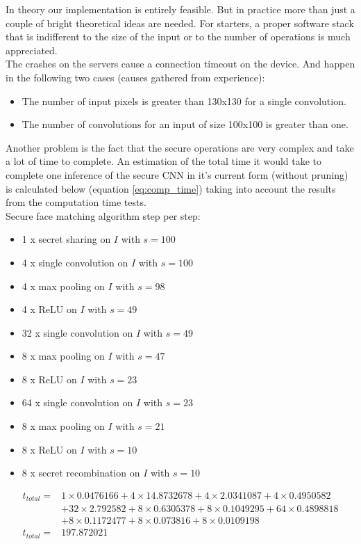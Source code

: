 In theory our implementation is entirely feasible. But in practice more than just a couple of bright theoretical ideas are needed. For starters, a proper software stack that is indifferent to the size of the input or to the number of operations is much appreciated.\\

The crashes on the servers cause a connection timeout on the device. And happen in the following two cases (causes gathered from experience):

\begin{itemize}
  \item The number of input pixels is greater than 130x130 for a single convolution.
  \item The number of convolutions for an input of size 100x100 is greater than one.
\end{itemize}

Another problem is the fact that the secure operations are very complex and take a lot of time to complete. An estimation of the total time it would take to complete one inference of the secure CNN in it's current form (without pruning) is calculated below (equation \ref{eq:comp_time}) taking into account the results from the computation time tests.\\

Secure face matching algorithm step per step:
\begin{itemize}
  \item 1 x secret sharing on $I$ with $s=100$
  \item 4 x single convolution on $I$ with $s=100$
  \item 4 x max pooling on $I$ with $s=98$
  \item 4 x ReLU on $I$ with $s=49$
  \item 32 x single convolution on $I$ with $s=49$
  \item 8 x max pooling on $I$ with $s=47$
  \item 8 x ReLU on $I$ with $s=23$
  \item 64 x single convolution on $I$ with $s=23$
  \item 8 x max pooling on $I$ with $s=21$
  \item 8 x ReLU on $I$ with $s=10$
  \item 8 x secret recombination on $I$ with $s=10$
\end{itemize}

\begin{equation} \label{eq:comp_time}
  \begin{aligned}
      t_{total} = & 1\times0.0476166 + 4\times14.8732678 + 4\times2.0341087 + 4\times0.4950582\\
                & + 32\times2.792582 + 8\times0.6305378 + 8\times0.1049295 + 64\times0.4898818\\
                & + 8\times0.1172477 + 8\times0.073816 + 8\times 0.0109198\\
      t_{total} = & 197.872021
  \end{aligned}
\end{equation}

